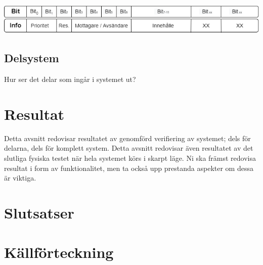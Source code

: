 \documentclass{article}
\begin{document}
\includegraphics[scale=0.5]{Projektrapport/protokoll.png}

\subsection{Delsystem}
Hur ser det delar som ingår i systemet ut?

\section{Resultat}
Detta avsnitt redovisar resultatet av genomförd verifiering av systemet; dels för delarna, dels för komplett system. 
Detta avsnitt redovisar även resultatet av det slutliga fysiska testet när hela systemet körs i skarpt läge. 
Ni ska främst redovisa resultat i form av funktionalitet, men ta också upp prestanda aspekter om dessa är viktiga.  

\section{Slutsatser}


\newpage
\section{Källförteckning}
\printbibliography[heading=none]
\end{document}
